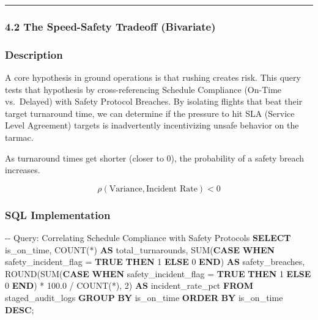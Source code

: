 \documentclass[
  letterpaper,
  DIV=11,
  numbers=noendperiod]{scrartcl}
\newenvironment{Shaded}{\begin{snugshade}}{\end{snugshade}}
\newcommand{\CommentTok}[1]{\textcolor[rgb]{0.37,0.37,0.37}{#1}}
\newcommand{\ControlFlowTok}[1]{\textcolor[rgb]{0.00,0.23,0.31}{\textbf{#1}}}
\newcommand{\DecValTok}[1]{\textcolor[rgb]{0.68,0.00,0.00}{#1}}
\newcommand{\FloatTok}[1]{\textcolor[rgb]{0.68,0.00,0.00}{#1}}
\newcommand{\FunctionTok}[1]{\textcolor[rgb]{0.28,0.35,0.67}{#1}}
\newcommand{\KeywordTok}[1]{\textcolor[rgb]{0.00,0.23,0.31}{\textbf{#1}}}
\newcommand{\NormalTok}[1]{\textcolor[rgb]{0.00,0.23,0.31}{#1}}
\newcommand{\OperatorTok}[1]{\textcolor[rgb]{0.37,0.37,0.37}{#1}}
\begin{document}
\begin{center}\rule{0.5\linewidth}{0.5pt}\end{center}

\subsubsection{4.2 The Speed-Safety Tradeoff
(Bivariate)}\label{the-speed-safety-tradeoff-bivariate}

\subsubsection{Description}

A core hypothesis in ground operations is that rushing creates risk.
This query tests that hypothesis by cross-referencing Schedule
Compliance (On-Time vs.~Delayed) with Safety Protocol Breaches. By
isolating flights that beat their target turnaround time, we can
determine if the pressure to hit SLA (Service Level Agreement) targets
is inadvertently incentivizing unsafe behavior on the tarmac.

As turnaround times get shorter (closer to 0), the probability of a
safety breach increases.

\[\rho(\text{Variance}, \text{Incident Rate}) < 0\]

\subsubsection{SQL Implementation}

\begin{Shaded}
\begin{Highlighting}[]
\CommentTok{{-}{-} Query: Correlating Schedule Compliance with Safety Protocols}
\KeywordTok{SELECT} 
\NormalTok{    is\_on\_time,}
    \FunctionTok{COUNT}\NormalTok{(}\OperatorTok{*}\NormalTok{) }\KeywordTok{AS}\NormalTok{ total\_turnarounds,}
    \FunctionTok{SUM}\NormalTok{(}\ControlFlowTok{CASE} \ControlFlowTok{WHEN}\NormalTok{ safety\_incident\_flag }\OperatorTok{=} \KeywordTok{TRUE} \ControlFlowTok{THEN} \DecValTok{1} \ControlFlowTok{ELSE} \DecValTok{0} \ControlFlowTok{END}\NormalTok{) }\KeywordTok{AS}\NormalTok{ safety\_breaches,}
    \FunctionTok{ROUND}\NormalTok{(}\FunctionTok{SUM}\NormalTok{(}\ControlFlowTok{CASE} \ControlFlowTok{WHEN}\NormalTok{ safety\_incident\_flag }\OperatorTok{=} \KeywordTok{TRUE} \ControlFlowTok{THEN} \DecValTok{1} \ControlFlowTok{ELSE} \DecValTok{0} \ControlFlowTok{END}\NormalTok{) }\OperatorTok{*} \FloatTok{100.0} \OperatorTok{/} \FunctionTok{COUNT}\NormalTok{(}\OperatorTok{*}\NormalTok{), }\DecValTok{2}\NormalTok{) }\KeywordTok{AS}\NormalTok{ incident\_rate\_pct}
\KeywordTok{FROM}\NormalTok{ staged\_audit\_logs}
\KeywordTok{GROUP} \KeywordTok{BY}\NormalTok{ is\_on\_time}
\KeywordTok{ORDER} \KeywordTok{BY}\NormalTok{ is\_on\_time }\KeywordTok{DESC}\NormalTok{;}
\end{Highlighting}
\end{Shaded}
\end{document}

